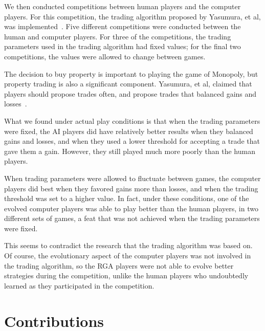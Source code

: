 We then conducted competitions between human players and the computer players.
For this competition, the trading algorithm proposed by Yasumura, et al, was
implemented~\cite{Yasumura2001Negotiate}. Five different competitions were
conducted between the human and computer players. For three of the competitions,
the trading parameters used in the trading algorithm had fixed values; for the
final two competitions, the values were allowed to change between games. 

The decision to buy property is important to playing the game of Monopoly, but
property trading is also a significant component. Yasumura, et al, claimed that
players should propose trades often, and propose trades that balanced gains and
losses~\cite{Yasumura2001Negotiate}.

What we found under actual play conditions is that when the trading parameters
were fixed, the AI players did have relatively better results when they balanced
gains and losses, and when they used a lower threshold for accepting a trade
that gave them a gain. However, they still played much more poorly than the
human players.

When trading parameters were allowed to fluctuate between games, the computer
players did best when they favored gains more than losses, and when the trading
threshold was set to a higher value. In fact, under these conditions, one of the
evolved computer players was able to play better than the human players, in two
different sets of games, a feat that was not achieved when the trading
parameters were fixed.

This seems to contradict the research that the trading algorithm was based on.
Of course, the evolutionary aspect of the computer players was not involved in
the trading algorithm, so the RGA players were not able to evolve better
strategies during the competition, unlike the human players who undoubtedly
learned as they participated in the competition.

\section{Contributions}

